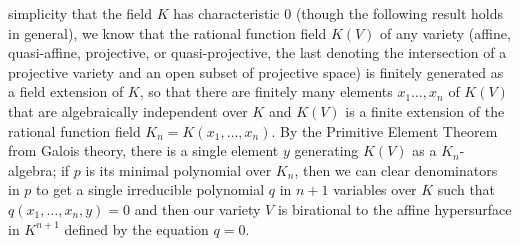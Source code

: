 \documentclass[10pt]{article}
\begin{document}
simplicity that the field $K$ has characteristic 0 (though the following
result holds in general), we know that the rational function field
$K(V)$ of any variety (affine, quasi-affine, projective, or
quasi-projective, the last denoting the intersection of a projective
variety and an open subset of projective space) is finitely generated as
a field extension of $K$, so that there are finitely many elements
$x_1\ldots,x_n$ of $K(V)$ that are algebraically independent over $K$
and $K(V)$ is a finite extension of the rational function field
$K_n=K(x_1,\ldots,x_n)$. By the Primitive Element Theorem from Galois
theory, there is a single element $y$ generating $K(V)$ as a
$K_n$-algebra; if $p$ is its minimal polynomial over $K_n$, then we can
clear denominators in $p$ to get a single irreducible polynomial $q$ in
$n+1$ variables over $K$ such that $q(x_1,\ldots,x_n,y) = 0$ and then
our variety $V$ is birational to the affine hypersurface in $K^{n+1}$
defined by the equation $q=0$.
\end{document}
